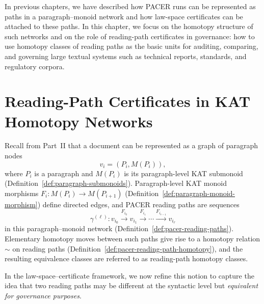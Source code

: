 \documentclass[11pt]{book}
\theoremstyle{plain}
\theoremstyle{definition}
\theoremstyle{remark}
\begin{document}
In previous chapters, we have described how PACER runs can be
represented as paths in a paragraph–monoid network and how law-space
certificates can be attached to these paths. In this chapter, we
focus on the homotopy structure of such networks and on the role of
reading-path certificates in governance: how to use homotopy classes
of reading paths as the basic units for auditing, comparing, and
governing large textual systems such as technical reports, standards,
and regulatory corpora.

\section[Reading-Path Certificates in KAT Homotopy Networks]{Reading-Path Certificates in KAT Homotopy Networks}


Recall from Part~II that a document can be represented as a graph of
paragraph nodes
\[
  v_i = (P_i,M(P_i)),
\]
where $P_i$ is a paragraph and $M(P_i)$ is its paragraph-level KAT
submonoid (Definition~\ref{def:paragraph-submonoids}). Paragraph-level
KAT monoid morphisms
$F_i:M(P_i)\to M(P_{i+1})$ (Definition~\ref{def:paragraph-monoid-morphism})
define directed edges, and PACER reading paths are sequences
\[
  \gamma^{(\ell)}:
  v_{i_0}\xrightarrow{F_{i_0}}v_{i_1}\xrightarrow{F_{i_1}}\cdots
  \xrightarrow{F_{i_{r-1}}}v_{i_r}
\]
in this paragraph–monoid network (Definition~\ref{def:pacer-reading-paths}).
Elementary homotopy moves between such paths give rise to a homotopy
relation $\sim$ on reading paths
(Definition~\ref{def:pacer-reading-path-homotopy}), and the resulting
equivalence classes are referred to as reading-path homotopy classes.

In the law-space–certificate framework, we now refine this notion to
capture the idea that two reading paths may be different at the
syntactic level but \emph{equivalent for governance purposes}.
\end{document}
